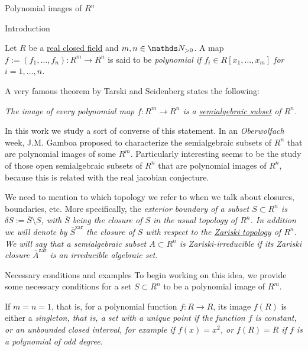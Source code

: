\documentclass[11pt, a4paper, english, twoside, notitlepage, openright]{report}
\begin{document}
\begin{chapter}{Polynomial images of $R^n$}

\begin{section}{Introduction}
\begin{definition}\label{polyMap} Let $R$ be a \hyperref[realCField]{real closed field} and $m,n\in\N_{>0}$. A map $f:=(f_1,\dots,f_n):R^m\to R^n$ is said to be \em polynomial \em if $f_i\in R[x_1,\dots,x_m]$ for $i=1,\dots,n$. 
\end{definition}
	
A very famous theorem by Tarski and Seidenberg states the following:
\begin{theorem}\label{tarskiSeidenberg} \em The image of every polynomial map $f: R^m \longrightarrow R^n$ is a \hyperref[semialgSet]{semialgebraic subset} of $R^n$. \em
\end{theorem}
	
In this work we study a sort of converse of this statement. In an \emph{Oberwolfach} week, J.M. Gamboa \cite{g} proposed to characterize the semialgebraic subsets of $R^n$ that are polynomial images of some $R^m$. Particularly interesting seems to be the study of those open semialgebraic subsets of $R^n$ that are polynomial images of $R^n$, because this is related with the real jacobian conjecture.
	
\begin{notation} We need to mention to which topology we refer to when we talk about closures, boundaries, etc. More specifically, the \em exterior boundary \em of a subset $S\subset R^n$ is $\delta S:=\overline{S}\setminus S$, with $\overline{S}$ being the \em closure \em of $S$ in the usual topology of $R^n$. In addition we will denote by $\overline{S}^{\text{zar}}$ the closure of $S$ with respect to the \hyperref[zariski]{Zariski topology} of $R^n$. We will say that a semialgebraic subset $A\subset R^n$ is \em Zariski-irreducible \em if its Zariski closure $\overline{A}^{\text{zar}}$ is an irreducible algebraic set.
\end{notation}
	
\begin{subsection}{Necessary conditions and examples} To begin working on this idea, we provide some necessary conditions for a set $S\subset R^n$ to be a polynomial image of $R^m$. 
	
If $m=n=1$, that is, for a polynomial function $f:R\to R$, its image $f(R)$ is either a \em singleton, \em that is, a set with a unique point if the function $f$ is constant, or an unbounded closed interval, for example if $f(x)=x^2$, or $f(R)=R$ if $f$ is a polynomial of odd degree.
	

\end{subsection}
\end{section}
\end{chapter}
\end{document}
